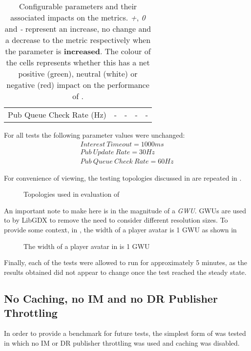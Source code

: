 \begin{table}[H]
\begin{tabular}{@{}lcccc@{}}
    Pub Queue Check Rate (Hz)                      & \cellcolor[HTML]{FFCCC9}-        & \cellcolor[HTML]{FFCCC9}-        & \cellcolor[HTML]{FFCCC9}-               & \cellcolor[HTML]{9AFF99}-                  
    \end{tabular}
    \centering
    \caption{Configurable parameters and their associated impacts on the metrics. \textit{+}, \textit{0} and \textit{-} represent an increase, no change and a decrease to the metric respectively when the parameter is \textbf{increased}. The colour of the cells represents whether this has a net positive (green), neutral (white) or negative (red) impact on the performance of \game{}.}
    \label{tbl:eval:metric-matrix}
\end{table}

For all tests the following parameter values were unchanged:
\begin{gather*}
    Interest\ Timeout = 1000ms\\
    Pub\ Update\ Rate = 30Hz\\
    Pub\ Queue\ Check\ Rate = 60Hz
\end{gather*}

For convenience of viewing, the testing topologies discussed in  are repeated in .

\begin{figure}[H]
    \centering
    \caption{Topologies used in evaluation of \game{}}
    \label{fig:eval:topologies}
\end{figure}

An important note to make here is in the magnitude of a \textit{GWU}. GWUs are used to by LibGDX to remove the need to consider different resolution sizes. To provide some context, in \game{}, the width of a player avatar is 1 GWU as shown in 

\begin{figure}[H]
    \centering
    \caption{The width of a player avatar in \game{} is 1 GWU}
    \label{fig:eval:gwus}
\end{figure}

Finally, each of the tests were allowed to run for approximately 5 minutes, as the results obtained did not appear to change once the test reached the steady state.

\subsection{No Caching, no IM and no DR Publisher Throttling}
In order to provide a benchmark for future tests, the simplest form of \game{} was tested in which no IM or DR publisher throttling was used and caching was disabled.

